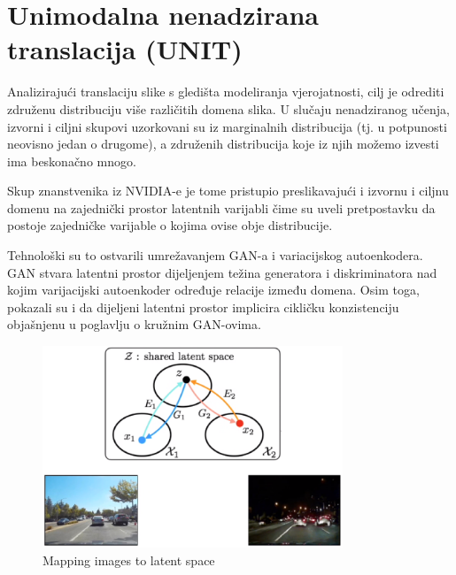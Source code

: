 \documentclass[lmodern, utf8, seminar]{fer}
\begin{document}
\newpage
\section{Unimodalna nenadzirana translacija (UNIT)} 
Analizirajući translaciju slike s gledišta modeliranja vjerojatnosti, cilj je odrediti združenu distribuciju više različitih domena slika. U slučaju nenadziranog učenja, izvorni i ciljni skupovi uzorkovani su iz marginalnih distribucija (tj. u potpunosti neovisno jedan o drugome), a združenih distribucija koje iz njih možemo izvesti ima beskonačno mnogo.
\newline

Skup znanstvenika iz NVIDIA-e je tome pristupio preslikavajući i izvornu i ciljnu domenu na zajednički prostor latentnih varijabli čime su uveli pretpostavku da postoje zajedničke varijable o kojima ovise obje distribucije. 
\newline

Tehnološki su to ostvarili umrežavanjem GAN-a i variacijskog autoenkodera. GAN stvara latentni prostor dijeljenjem težina generatora i diskriminatora nad kojim varijacijski autoenkoder određuje relacije između domena. 
Osim toga, pokazali su \cite{liu2017unsupervised} i da dijeljeni latentni prostor implicira cikličku konzistenciju objašnjenu u poglavlju o kružnim GAN-ovima.
\newline

\begin{figure}[H]
    \centering
    \includegraphics[width=0.8\textwidth]{liu2017unsupervised-unit-latent}
    \caption{Mapping images to latent space \cite{liu2017unsupervised}}
    \label{fig:liu2017unsupervised-unit-latent}
\end{figure}


\newpage
\end{document}
